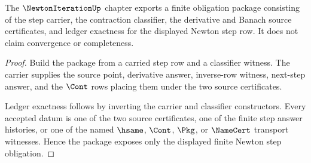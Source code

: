 \begin{theorem}
\label{thm:newtoniteration-obligation-package}
The $\NewtonIterationUp$ chapter exports a finite obligation package consisting of the step carrier, the contraction classifier, the derivative and Banach source certificates, and ledger exactness for the displayed Newton step row. It does not claim convergence or completeness.
\end{theorem}
\begin{proof}
Build the package from a carried step row and a classifier witness. The carrier supplies the source point, derivative answer, inverse-row witness, next-step answer, and the $\Cont$ rows placing them under the two source certificates.

Ledger exactness follows by inverting the carrier and classifier constructors. Every accepted datum is one of the two source certificates, one of the finite step answer histories, or one of the named $\hsame$, $\Cont$, $\Pkg$, or $\NameCert$ transport witnesses. Hence the package exposes only the displayed finite Newton step obligation.
\end{proof}

